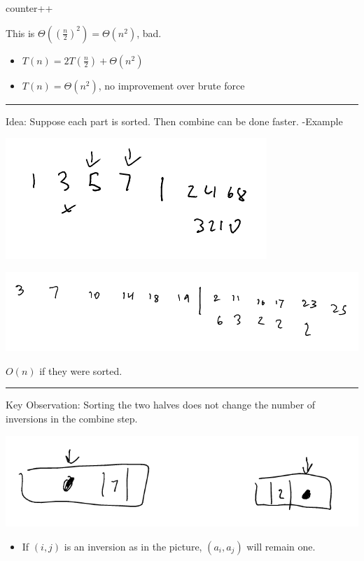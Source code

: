 \documentclass[11pt]{article}
\begin{document}
\begin{algorithmic}
		 counter++
		\EndIf
	\EndFor
\EndFor
\end{algorithmic}
This is \(\Theta(\left(\frac{n}{2}\right)^2) = \Theta(n^2)\), bad.

\begin{itemize}
\item \(T(n)=2T(\frac{n}{2})+\Theta(n^2)\)
\item \(T(n)=\Theta(n^2)\), no improvement over brute force
\end{itemize}

\noindent\rule{\textwidth}{0.5pt}
Idea: Suppose each part is sorted. Then combine can be done faster. 
-Example
\begin{center}
\includegraphics[width=.9\linewidth]{./Images/i72.png}
\end{center}
\begin{center}
\includegraphics[width=.9\linewidth]{./Images/i73.png}
\end{center}
\(O(n)\) if they were sorted.

\noindent\rule{\textwidth}{0.5pt}
Key Observation: Sorting the two halves does not change the number of inversions in the combine step.
\begin{center}
\includegraphics[width=.9\linewidth]{./Images/i74.png}
\end{center}
\begin{itemize}
\item If \((i,j)\) is an inversion as in the picture, \((a_i, a_j)\) will remain one.
\end{itemize}
\end{document}

